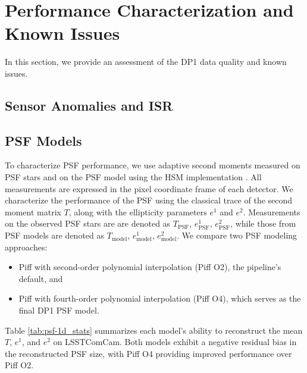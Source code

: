 \section{Performance Characterization and Known Issues}
\label{sec:performance}
%
In this section, we provide an assessment of the \gls{DP1} data quality and known issues.
%

\subsection{Sensor Anomalies and ISR}
\label{ssec:sensor_anomalies}



\subsection{PSF Models}
\label{ssec:psf_models}
To characterize \gls{PSF}  performance, we use adaptive second moments \citep{2002AJ....123..583B} measured on \gls{PSF} stars and on the PSF model using the \gls{HSM} implementation \citep{2003MNRAS.343..459H, 2005MNRAS.361.1287M}.
All measurements are expressed in the pixel coordinate frame of each detector.
We characterize the performance of the PSF using the classical trace of the  second moment matrix $T$, along with the ellipticity parameters $e^1$ and $e^2$.
Measurements on the observed PSF stars are are denoted as  $T_{\text{PSF}}$, $e^1_{\text{PSF}}$,  $e^2_{\text{PSF}}$, while those from PSF models are denoted as  $T_{\text{model}}$, $e^1_{\text{model}}$, $e^2_{\text{model}}$.
We compare two PSF modeling approaches:
\begin{itemize}
\item Piff with second-order polynomial interpolation (Piff O2), the pipeline's default, and
\item Piff with fourth-order polynomial interpolation (Piff O4), which serves as the final DP1 PSF model.	
\end{itemize}
Table \ref{tab:psf-1d_stats} summarizes each model’s ability to reconstruct the mean $T$, $e^1$, and $e^2$ on  \gls{LSSTComCam}. 
Both models exhibit a negative residual bias in the reconstructed PSF size, with Piff O4 providing improved performance over Piff O2.


